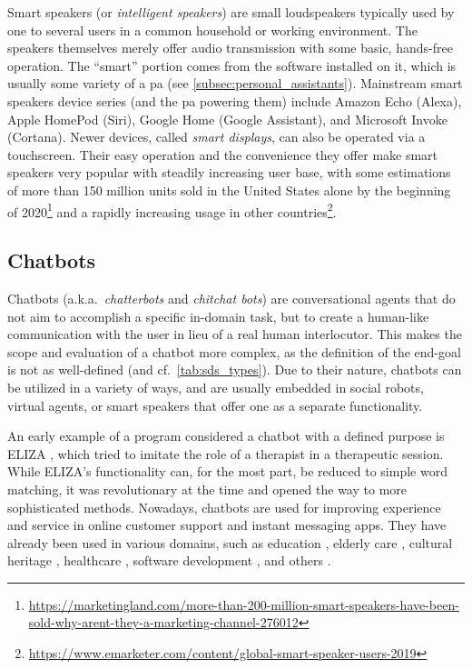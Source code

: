 Smart speakers (or \emph{intelligent speakers}) are small loudspeakers typically used by one to several users in a common household or working environment.
The speakers themselves merely offer audio transmission with some basic, hands-free operation.
The \enquote{smart} portion comes from the software installed on it, which is usually some variety of a \ac{pa} (see \cref{subsec:personal_assistants}).
Mainstream smart speakers device series (and the \ac{pa} powering them) include Amazon Echo (Alexa), Apple HomePod (Siri), Google Home (Google Assistant), and Microsoft Invoke (Cortana).
Newer devices, called \emph{smart displays}, can also be operated via a touchscreen.
Their easy operation and the convenience they offer make smart speakers very popular with steadily increasing user base, with some estimations of more than 150 million units sold in the United States alone by the beginning of 2020\footnote{\url{https://marketingland.com/more-than-200-million-smart-speakers-have-been-sold-why-arent-they-a-marketing-channel-276012}} and a rapidly increasing usage in other countries\footnote{\url{https://www.emarketer.com/content/global-smart-speaker-users-2019}}.

\subsection{Chatbots}
\label{subsec:chatbots}

Chatbots (a.k.a.\ \emph{chatterbots} and \emph{chitchat bots}) are conversational agents that do not aim to accomplish a specific in-domain task, but to create a human-like communication with the user in lieu of a real human interlocutor.
This makes the scope and evaluation of a chatbot more complex, as the definition of the end-goal is not as well-defined (and cf.\ \cref{tab:sds_types}).
Due to their nature, chatbots can be utilized in a variety of ways, and are usually embedded in social robots, virtual agents, or smart speakers that offer one as a separate functionality.

An early example of a program considered a chatbot with a defined purpose is ELIZA \citep{Weizenbaum1966eliza}, which tried to imitate the role of a therapist in a therapeutic session.
While ELIZA's functionality can, for the most part, be reduced to simple word matching, it was revolutionary at the time and opened the way to more sophisticated methods.
Nowadays, chatbots are used for improving experience and service in online customer support and instant messaging apps.
They have already been used in various domains, such as education \citep{Benotti2014engaging, Kerly2007bringing}, elderly care \citep{Iio2020twin}, cultural heritage \citep{Pilato2005expert}, healthcare \citep{Kowatsch2017text}, software development \citep{Lebeuf2017software}, and others \citep{Shawar2007chatbots}.

